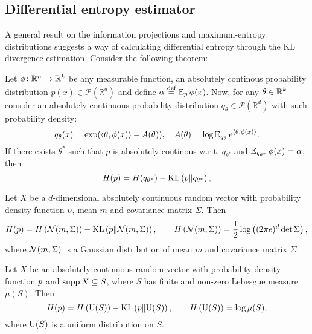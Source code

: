 \subsection{Differential entropy estimator}
\label{appendix:entropy_estimator}

A general result on the information projections and maximum-entropy distributions suggests a way of calculating differential entropy through the KL divergence estimation. 
Consider the following theorem:

\begin{theorem}\label{th:entropy_kl_exponential}
    Let $ \phi \colon \mathbb{R}^n \to \mathbb{R}^k $ be any measurable function, an absolutely continous probability distribution $p(x)\in \mathcal{P}(\mathbb{R}^d)$ and define $ \alpha \stackrel{\text{def}}{=} \operatorname{\mathbb{E}}_{p} \phi(x) $.
    Now, for any $ \theta \in \mathbb{R}^k $ consider an absolutely continuous probability distribution $ q_\theta \in \mathcal{P}(\mathbb{R}^d)$ with such probability density:
    \[
        q_\theta(x) = \exp(\left\langle \theta , \phi(x) \right\rangle - A(\theta)), \quad A(\theta) = \log \operatorname{\mathbb{E}}_{q_{\theta}} e^{\left\langle \theta , \phi(x) \right\rangle}.
    \]
    If there exists $ \theta^* $ such that $p$ is absolutely continous w.r.t. $q_{\theta^*}$ and $ \operatorname{\mathbb{E}}_{q_{\theta^*}} \phi(x) = \alpha $, then
    \[
        H(p) = H(q_{\theta^*}) - \mathrm{KL}\left(p \middle\Vert q_{\theta^*}\right),
    \]
\end{theorem}



\begin{corollary}
    \label{corollary:Gaussian_maximizes_entropy}
    Let $ X $ be a $ d $-dimensional absolutely continuous random vector with probability density function $ p $, mean $ m $ and covariance matrix $ \Sigma $.
    Then
    \begin{equation*}
        \label{eq:Gaussian_maximizes_entropy}
        H(p) = H\left( \mathcal{N}(m, \Sigma) \right) - \mathrm{KL}\left(p \middle\Vert \mathcal{N}(m, \Sigma)\right), \qquad H\left( \mathcal{N}(m, \Sigma) \right) = \frac{1}{2} \log \left( (2 \pi e)^d \det \Sigma \right),
    \end{equation*}
    where $ \mathcal{N}(m, \Sigma) $ is a Gaussian distribution of mean $ m $ and covariance matrix $ \Sigma $.
\end{corollary}

\begin{corollary}
    \label{corollary:uniform_maximizes_entropy}
    Let $ X $ be an absolutely continuous random vector with probability density function $ p $
    and $ \operatorname{\mathrm{supp}} X \subseteq S $, where $ S $ has finite and non-zero Lebesgue measure $ \mu(S) $.
    Then
    \begin{equation*}
        \label{eq:uniform_maximizes_entropy}
        H(p) = H\left( \mathrm{U}(S) \right) - \mathrm{KL}\left(p \middle\Vert \mathrm{U}(S)\right), \qquad H\left( \mathrm{U}(S) \right) = 
        \log \mu(S),
    \end{equation*}
    where $ \mathrm{U}(S) $ is a uniform distribution on $ S $.
\end{corollary}


